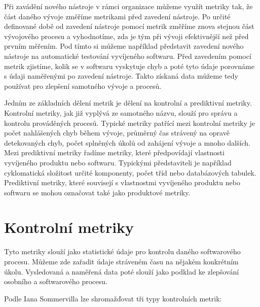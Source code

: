\documentclass[czech,master]{diploma}
\begin{document}
Při zavádění nového nástroje v rámci organizace můžeme využít metriky tak, že část daného vývoje změříme metrikami před zavedení nástroje. Po určité definované době od zavedení nástroje pomocí metrik změříme znova stejnou část vývojového procesu a vyhodnotíme, zda je tým při vývoji efektivnější než před prvním měřením. Pod tímto si můžeme například představit zavedení nového nástroje na automatické testování vyvíjeného softwaru. Před zavedením pomocí metrik zjistíme, kolik se v softwaru vyskytuje chyb a poté tyto údaje porovnáme s údaji naměřenými po zavedení nástroje. Takto získaná data můžeme tedy používat pro zlepšení samotného vývoje a procesů.

Jedním ze základních dělení metrik je dělení na kontrolní a prediktivní metriky. Kontrolní metriky, jak již vyplývá ze samotného názvu, slouží pro správu a kontrolu prováděných procesů. Typické metriky patřící mezi kontrolní metriky je počet nahlášených chyb během vývoje, průměrný čas strávený na opravě detekovaných chyb, počet splněných úkolů od zahájení vývoje a mnoho dalších. Mezi prediktivní metriky řadíme metriky, které předpovídají vlastnosti vyvíjeného produktu nebo softwaru. Typickými představiteli je například cyklomatická složitost určité komponenty, počet tříd nebo databázových tabulek. Prediktivní metriky, které souvisejí s vlastnostmi vyvíjeného produktu nebo softwaru se mohou označovat také jako produktové metriky. \cite{ref:metric_definition}

\section{Kontrolní metriky}
Tyto metriky slouží jako statistické údaje pro kontrolu daného softwarového procesu. Můžeme zde zařadit údaje stráveném času na nějakém konkrétním úkolu. Vysledovaná a naměřená data poté slouží jako podklad ke zlepšování osobního a softwarového procesu.

Podle Iana Sommervilla \cite{ref:kontrolni_metriky} lze shromažďovat tři typy kontrolních metrik:
\end{document}
